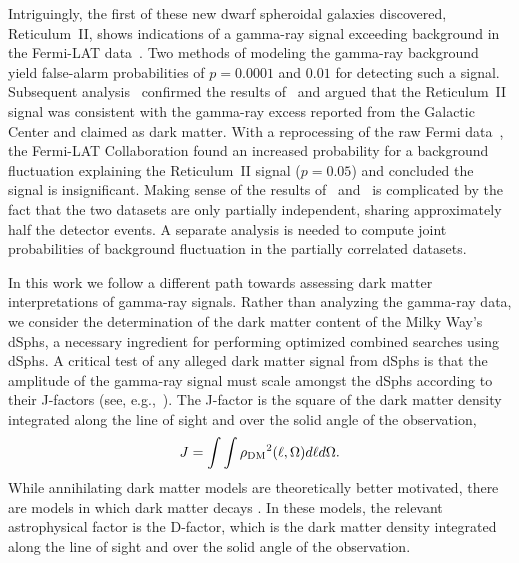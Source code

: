 \documentclass[prd,twocolumn,showpacs,preprintnumbers,superscriptaddress,nofootinbib,amsmath,amssymb,nobalancelastpage]{revtex4}
\def\rhoDM{{\rho_{\rm DM}}}
\def\rhoDM{{\rho_{\rm DM}}}
\begin{document}
Intriguingly, the first of these new dwarf spheroidal galaxies discovered, Reticulum~II,
shows indications of a gamma-ray signal exceeding background in the
Fermi-LAT data~\cite{2015PhRvL.115h1101G}.  Two methods of modeling
the gamma-ray background yield false-alarm probabilities of $p=0.0001$
and $0.01$ for detecting such a signal. Subsequent
analysis~\cite{2015JCAP...09..016H} confirmed the results
of~\cite{2015PhRvL.115h1101G} and argued that the Reticulum~II signal
was consistent with the gamma-ray excess reported from the Galactic
Center and claimed as dark matter. With a reprocessing of the raw
Fermi data~\cite{2015ApJ...809L...4D}, the Fermi-LAT Collaboration
found an increased probability for a background fluctuation explaining
the Reticulum~II signal ($p=0.05$) and concluded the signal is
insignificant. Making sense of the results
of~\cite{2015PhRvL.115h1101G} and~\cite{2015ApJ...809L...4D} is
complicated by the fact that the two datasets are only partially
independent, sharing approximately half the detector events. A
separate analysis is needed to compute joint probabilities of
background fluctuation in the partially correlated datasets.

In this work we follow a different path towards assessing dark matter interpretations of gamma-ray signals.
Rather than analyzing the gamma-ray data, we consider the determination of the dark matter
content of the Milky Way's dSphs, a necessary ingredient for performing optimized combined searches using
dSphs. A critical test of any alleged dark
matter signal from dSphs is that the amplitude of the gamma-ray signal must
scale amongst the dSphs according to their J-factors (see,
e.g.,~\cite{2015ApJ...801...74G,2015MNRAS.453..849B}). The J-factor is
the square of the dark matter density integrated along the line of
sight and over the solid angle of the observation,
%
\begin{equation}
J = \int\int \rhoDM^2(\ell, \Omega) d\ell d\Omega.
\label{eq:Jfactor}
\end{equation}
%
While annihilating dark matter models are theoretically better motivated, there are models in which dark matter decays \citep{Ibarra2013}. In these models, the relevant astrophysical factor is the D-factor, which is the dark matter density integrated along the line of
sight and over the solid angle of the observation.
\end{document}
